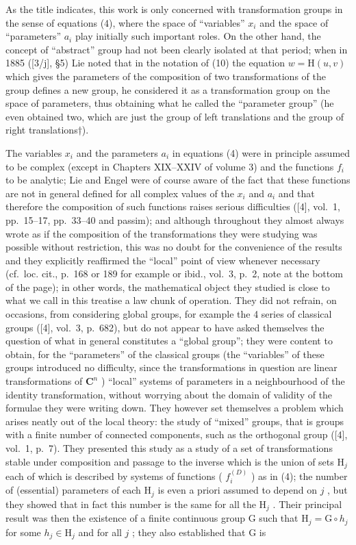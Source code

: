 As the title indicates, this work is only concerned with transformation groups in the sense of equations (4), where the space of ``variables'' \(x_{i}\) and the space of ``parameters'' \(a_{i}\) play initially such important roles. On the other hand, the concept of ``abstract'' group had not been clearly isolated at that period; when in 1885 ({[}3/j{]}, §5) Lie noted that in the notation of (10) the equation \(w = \mathrm{H}(u, v)\) which gives the parameters of the composition of two transformations of the group defines a new group, he considered it as a transformation group on the space of parameters, thus obtaining what he called the ``parameter group'' (he even obtained two, which are just the group of left translations and the group of right translations†).

The variables \(x_{i}\) and the parameters \(a_{i}\) in equations (4) were in principle assumed to be complex (except in Chapters XIX--XXIV of volume 3) and the functions \(f_{i}\) to be analytic; Lie and Engel were of course aware of the fact that these functions are not in general defined for all complex values of the \(x_{i}\) and \(a_{i}\) and that therefore the composition of such functions raises serious difficulties ({[}4{]}, vol.~1, pp.~15--17, pp.~33--40 and passim); and although throughout they almost always wrote as if the composition of the transformations they were studying was possible without restriction, this was no doubt for the convenience of the results and they explicitly reaffirmed the ``local'' point of view whenever necessary (cf.~loc. cit., p.~168 or 189 for example or ibid., vol.~3, p.~2, note at the bottom of the page); in other words, the mathematical object they studied is close to what we call in this treatise a law chunk of operation. They did not refrain, on occasions, from considering global groups, for example the 4 series of classical groups ({[}4{]}, vol.~3, p.~682), but do not appear to have asked themselves the question of what in general constitutes a ``global group''; they were content to obtain, for the ``parameters'' of the classical groups (the ``variables'' of these groups introduced no difficulty, since the transformations in question are linear transformations of \(\mathbf{C}^n\) ) ``local'' systems of parameters in a neighbourhood of the identity transformation, without worrying about the domain of validity of the formulae they were writing down. They however set themselves a problem which arises neatly out of the local theory: the study of ``mixed'' groups, that is groups with a finite number of connected components, such as the orthogonal group ({[}4{]}, vol.~1, p.~7). They presented this study as a study of a set of transformations stable under composition and passage to the inverse which is the union of sets \(\mathrm{H}_j\) each of which is described by systems of functions ( \(f_i^{(D)}\) ) as in (4); the number of (essential) parameters of each \(\mathrm{H}_j\) is even a priori assumed to depend on \(j\) , but they showed that in fact this number is the same for all the \(\mathrm{H}_j\) . Their principal result was then the existence of a finite continuous group G such that \(\mathrm{H}_j = \mathrm{G} \circ h_j\) for some \(h_j \in \mathrm{H}_j\) and for all \(j\) ; they also established that G is 